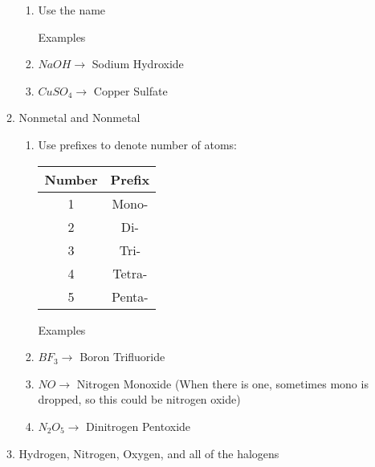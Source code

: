 \documentclass[12pt]{article}
\begin{document}
\begin{itemize}
\begin{enumerate}
\begin{enumerate}
      \item Use the name

        \begin{center} Examples \end{center}

      \item $NaOH \rightarrow$ Sodium Hydroxide

      \item $CuSO_4 \rightarrow$ Copper Sulfate

    \end{enumerate}

  \item Nonmetal and Nonmetal

    \begin{enumerate}

      \item Use prefixes to denote number of atoms:

        \begin{center}

          \begin{tabular}{c|c}

            Number & Prefix \\
            \hline
            1 & Mono- \\
            2 & Di- \\
            3 & Tri- \\
            4 & Tetra- \\
            5 & Penta- \\

          \end{tabular}

        Examples 

        \end{center}

      \item $BF_3 \rightarrow$ Boron Trifluoride

      \item $NO \rightarrow$ Nitrogen Monoxide (When there is one, sometimes mono is dropped, so this could be nitrogen oxide)

      \item $N_2O_5 \rightarrow$ Dinitrogen Pentoxide

    \end{enumerate}

  \item Hydrogen, Nitrogen, Oxygen, and all of the halogens


\end{enumerate}
\end{itemize}
\end{document}
